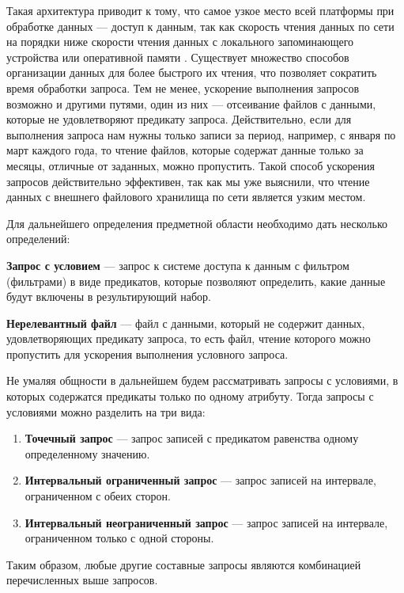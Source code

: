 Такая архитектура приводит к тому, что самое узкое место всей платформы при обработке данных --- доступ к данным, так как скорость чтения данных по сети на порядки ниже скорости чтения данных с локального запоминающего устройства или оперативной памяти \cite{HOI_BigData}. Существует множество способов организации данных для более быстрого их чтения, что позволяет сократить время обработки запроса. Тем не менее, ускорение выполнения запросов возможно и другими путями, один из них --- отсеивание файлов с данными, которые не удовлетворяют предикату запроса. Действительно, если для выполнения запроса нам нужны только записи за период, например, с января по март каждого года, то чтение файлов, которые содержат данные только за месяцы, отличные от заданных, можно пропустить. Такой способ ускорения запросов действительно эффективен, так как мы уже выяснили, что чтение данных с внешнего файлового хранилища по сети является узким местом.

Для дальнейшего определения предметной области необходимо дать несколько определений:
\begin{definition}
    \textbf{Запрос с условием} --- запрос к системе доступа к данным с фильтром (фильтрами) в виде предикатов, которые позволяют определить, какие данные будут включены в результирующий набор.
\end{definition}
\begin{definition}
    \textbf{Нерелевантный файл} --- файл с данными, который не содержит данных, удовлетворяющих предикату запроса, то есть файл, чтение которого можно пропустить для ускорения выполнения условного запроса.
\end{definition}

Не умаляя общности в дальнейшем будем рассматривать запросы с условиями, в которых содержатся предикаты только по одному атрибуту. Тогда запросы с условиями можно разделить на три вида:
\begin{enumerate}
    \item \textbf{Точечный запрос} ---  запрос записей с предикатом равенства одному определенному значению.
    \item \textbf{Интервальный ограниченный запрос} --- запрос записей на интервале, ограниченном с обеих сторон.
    \item \textbf{Интервальный неограниченный запрос} --- запрос записей на интервале, ограниченном только с одной стороны.
\end{enumerate}
Таким образом, любые другие составные запросы являются комбинацией перечисленных выше запросов.

